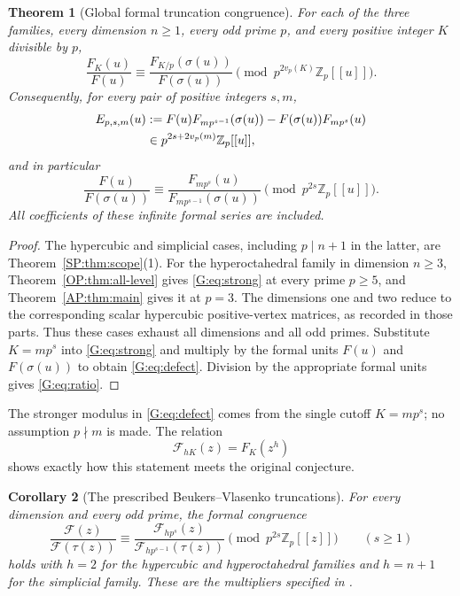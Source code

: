 \documentclass[11pt,a4paper]{article}
\newtheorem{theorem}{Theorem}[section]
\newtheorem{corollary}[theorem]{Corollary}
\theoremstyle{definition}\newtheorem{definition}[theorem]{Definition}
\theoremstyle{remark}\newtheorem{remark}[theorem]{Remark}
\numberwithin{equation}{section}
\begin{document}
\begin{theorem}[Global formal truncation congruence]
\label{G:thm:global}
For each of the three families, every dimension $n\ge1$, every odd
prime $p$, and every positive integer $K$ divisible by $p$,
\begin{equation}\label{G:eq:strong}
 \frac{F_K(u)}{F(u)}
 \equiv
 \frac{F_{K/p}(\sigma(u))}{F(\sigma(u))}
 \pmod{p^{2v_p(K)}\mathbb Z_p[[u]]}.
\end{equation}
Consequently, for every pair of positive integers $s,m$,
\begin{align}
 E_{p,s,m}(u)
 &:={F(u)F_{mp^{s-1}}(\sigma(u))
      -F(\sigma(u))F_{mp^s}(u)}\notag\\
 &\in p^{2s+2v_p(m)}\mathbb Z_p[[u]],
 \label{G:eq:defect}
\end{align}
and in particular
\begin{equation}\label{G:eq:ratio}
 \frac{F(u)}{F(\sigma(u))}
 \equiv\frac{F_{mp^s}(u)}{F_{mp^{s-1}}(\sigma(u))}
       \pmod{p^{2s}\mathbb Z_p[[u]]}.
\end{equation}
All coefficients of these infinite formal series are included.
\end{theorem}

\begin{proof}
The hypercubic and simplicial cases, including $p\mid n+1$ in the
latter, are Theorem~\ref{SP:thm:scope}(1). For the hyperoctahedral
family in dimension $n\ge3$, Theorem~\ref{OP:thm:all-level} gives
\eqref{G:eq:strong} at every prime $p\ge5$, and
Theorem~\ref{AP:thm:main} gives it at $p=3$. The dimensions one and
two reduce to the corresponding scalar hypercubic positive-vertex
matrices, as recorded in those parts. Thus these cases exhaust all
dimensions and all odd primes. Substitute $K=mp^s$ into
\eqref{G:eq:strong} and multiply by the formal units $F(u)$ and
$F(\sigma(u))$ to obtain \eqref{G:eq:defect}. Division by the
appropriate formal units gives \eqref{G:eq:ratio}.
\end{proof}

The stronger modulus in \eqref{G:eq:defect} comes from the single
cutoff $K=mp^s$; no assumption $p\nmid m$ is made.
The relation
\begin{equation}\label{G:eq:normalization}
 \mathcal F_{hK}(z)=F_K(z^h)
\end{equation}
shows exactly how this statement meets the original conjecture.

\begin{corollary}[The prescribed Beukers--Vlasenko truncations]
\label{G:cor:BV}
For every dimension and every odd prime, the formal congruence
\[
 \frac{\mathcal F(z)}{\mathcal F(\tau(z))}
 \equiv
 \frac{\mathcal F_{hp^s}(z)}
      {\mathcal F_{hp^{s-1}}(\tau(z))}
 \pmod{p^{2s}\mathbb Z_p[[z]]}
 \qquad(s\ge1)
\]
holds with $h=2$ for the hypercubic and hyperoctahedral families and
$h=n+1$ for the simplicial family. These are the multipliers specified
in \cite[Conjecture~7.5]{BV3}.
\end{corollary}
\end{document}
